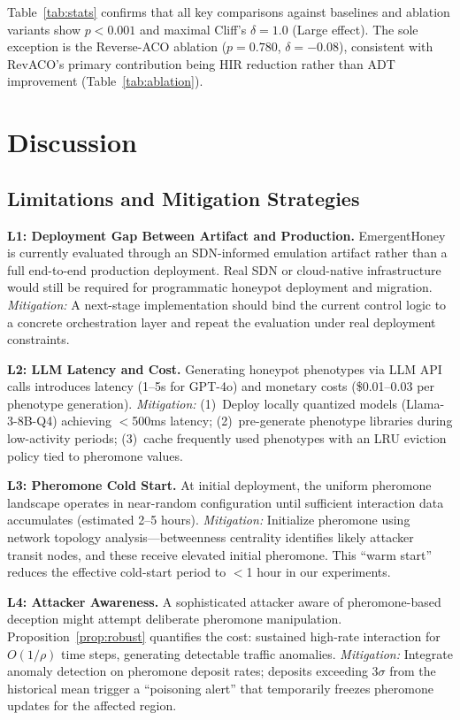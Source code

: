 \documentclass[review,3p,twocolumn]{elsarticle}
\begin{document}
Table~\ref{tab:stats} confirms that all key comparisons against baselines and ablation variants show $p < 0.001$ and maximal Cliff's $\delta = 1.0$ (Large effect). The sole exception is the Reverse-ACO ablation ($p = 0.780$, $\delta = -0.08$), consistent with RevACO's primary contribution being HIR reduction rather than ADT improvement (Table~\ref{tab:ablation}).


\section{Discussion}
\label{sec:discussion}

\subsection{Limitations and Mitigation Strategies}

\textbf{L1: Deployment Gap Between Artifact and Production.} EmergentHoney is currently evaluated through an SDN-informed emulation artifact rather than a full end-to-end production deployment. Real SDN or cloud-native infrastructure would still be required for programmatic honeypot deployment and migration. \emph{Mitigation:} A next-stage implementation should bind the current control logic to a concrete orchestration layer and repeat the evaluation under real deployment constraints.

\textbf{L2: LLM Latency and Cost.} Generating honeypot phenotypes via LLM API calls introduces latency (1--5s for GPT-4o) and monetary costs (\$0.01--0.03 per phenotype generation). \emph{Mitigation:} (1)~Deploy locally quantized models (Llama-3-8B-Q4) achieving $<$500ms latency; (2)~pre-generate phenotype libraries during low-activity periods; (3)~cache frequently used phenotypes with an LRU eviction policy tied to pheromone values.

\textbf{L3: Pheromone Cold Start.} At initial deployment, the uniform pheromone landscape operates in near-random configuration until sufficient interaction data accumulates (estimated 2--5 hours). \emph{Mitigation:} Initialize pheromone using network topology analysis---betweenness centrality identifies likely attacker transit nodes, and these receive elevated initial pheromone. This ``warm start'' reduces the effective cold-start period to $<$1 hour in our experiments.

\textbf{L4: Attacker Awareness.} A sophisticated attacker aware of pheromone-based deception might attempt deliberate pheromone manipulation. Proposition~\ref{prop:robust} quantifies the cost: sustained high-rate interaction for $O(1/\rho)$ time steps, generating detectable traffic anomalies. \emph{Mitigation:} Integrate anomaly detection on pheromone deposit rates; deposits exceeding $3\sigma$ from the historical mean trigger a ``poisoning alert'' that temporarily freezes pheromone updates for the affected region.
\end{document}
